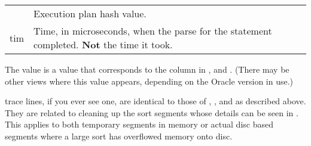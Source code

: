 \begin{longtable}[]{@{}l|l@{}}
\begin{minipage}[t]{0.14\columnwidth}
    \end{minipage} & \begin{minipage}[t]{0.65\columnwidth}\raggedright\strut
        Execution plan hash value.\strut
    \end{minipage}\tabularnewline
    \begin{minipage}[t]{0.14\columnwidth}\raggedright\strut
        tim\strut
    \end{minipage} & \begin{minipage}[t]{0.65\columnwidth}\raggedright\strut
        Time, in microseconds, when the parse for the statement completed.
        \textbf{Not} the time it took.\strut
    \end{minipage}\tabularnewline
    \bottomrule
\end{longtable}

The  value is a value that corresponds to the column  in ,  and . (There may be other views where this value appears, depending on the Oracle version in use.)

 trace lines, if you ever see one, are identical to those of , ,  and  as described above. They are related to cleaning up the sort segments whose details can be seen in . This applies to both temporary segments in memory or actual disc based segments where a large sort has overflowed memory onto disc. 

